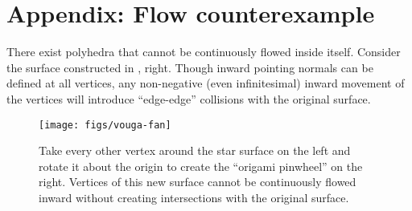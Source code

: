 \section*{Appendix: Flow counterexample}
%
\label{app:counterexample}
%
There exist polyhedra that cannot be continuously flowed inside itself.
%
Consider the surface constructed in , right. Though inward
pointing normals can be defined at all vertices, any non-negative (even
infinitesimal) inward movement of the vertices will introduce ``edge-edge''
collisions with the original surface.
%
\begin{figure}[hb]
\texttt{[image: figs/vouga-fan]}
\caption{Take every other vertex around the star surface on the left and
rotate it about the origin to create the ``origami pinwheel'' on the right.
Vertices of this new surface cannot be continuously flowed inward without
creating intersections with the original surface.}
\label{fig:vouga-fan}
\end{figure}
